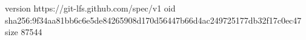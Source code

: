 version https://git-lfs.github.com/spec/v1
oid sha256:9f34aa81bb6c6e5de84265908d170d56447b66d4ac249725177db32f17c0ec47
size 87544
